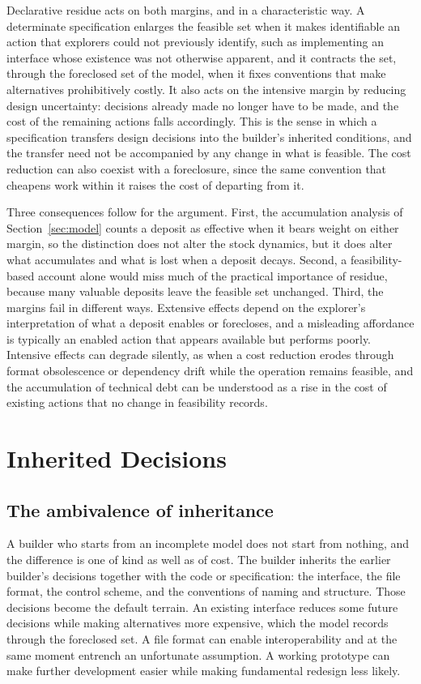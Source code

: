 \documentclass[11pt]{article}
\theoremstyle{definition}
\theoremstyle{remark}
\begin{document}
Declarative residue acts on both margins, and in a characteristic way. A determinate specification enlarges the feasible set when it makes identifiable an action that explorers could not previously identify, such as implementing an interface whose existence was not otherwise apparent, and it contracts the set, through the foreclosed set of the model, when it fixes conventions that make alternatives prohibitively costly. It also acts on the intensive margin by reducing design uncertainty: decisions already made no longer have to be made, and the cost of the remaining actions falls accordingly. This is the sense in which a specification transfers design decisions into the builder's inherited conditions, and the transfer need not be accompanied by any change in what is feasible. The cost reduction can also coexist with a foreclosure, since the same convention that cheapens work within it raises the cost of departing from it.

Three consequences follow for the argument. First, the accumulation analysis of Section~\ref{sec:model} counts a deposit as effective when it bears weight on either margin, so the distinction does not alter the stock dynamics, but it does alter what accumulates and what is lost when a deposit decays. Second, a feasibility-based account alone would miss much of the practical importance of residue, because many valuable deposits leave the feasible set unchanged. Third, the margins fail in different ways. Extensive effects depend on the explorer's interpretation of what a deposit enables or forecloses, and a misleading affordance is typically an enabled action that appears available but performs poorly. Intensive effects can degrade silently, as when a cost reduction erodes through format obsolescence or dependency drift while the operation remains feasible, and the accumulation of technical debt can be understood as a rise in the cost of existing actions that no change in feasibility records.

\section{Inherited Decisions}\label{sec:inherit}

\subsection{The ambivalence of inheritance}

A builder who starts from an incomplete model does not start from nothing, and the difference is one of kind as well as of cost. The builder inherits the earlier builder's decisions together with the code or specification: the interface, the file format, the control scheme, and the conventions of naming and structure. Those decisions become the default terrain. An existing interface reduces some future decisions while making alternatives more expensive, which the model records through the foreclosed set. A file format can enable interoperability and at the same moment entrench an unfortunate assumption. A working prototype can make further development easier while making fundamental redesign less likely.
\end{document}

